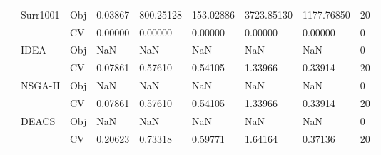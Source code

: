\begin{table*}[!htb]
\begin{tabular}{lllllllll}
		& Surr1001                           & Obj                                & 0.03867                            & 800.25128                          & 153.02886                            & 3723.85130                          & 1177.76850                        & 20               \\
		&                                    & CV                                 & 0.00000                            & 0.00000                            & 0.00000                              & 0.00000                             & 0.00000                           & 0                \\
		& IDEA                               & Obj                                & NaN                                & NaN                                & NaN                                  & NaN                                 & NaN                               & 0                \\
		&                                    & CV                                 & 0.07861                            & 0.57610                            & 0.54105                              & 1.33966                             & 0.33914                           & 20               \\
		& NSGA-II                            & Obj                                & NaN                                & NaN                                & NaN                                  & NaN                                 & NaN                               & 0                \\
		&                                    & CV                                 & 0.07861                            & 0.57610                            & 0.54105                              & 1.33966                             & 0.33914                           & 20               \\
		& DEACS                              & Obj                                & NaN                                & NaN                                & NaN                                  & NaN                                 & NaN                               & 0                \\
		&                                    & CV                                 & 0.20623                            & 0.73318                            & 0.59771                              & 1.64164                             & 0.37136                           & 20               \\

\end{tabular}
\end{table*}
